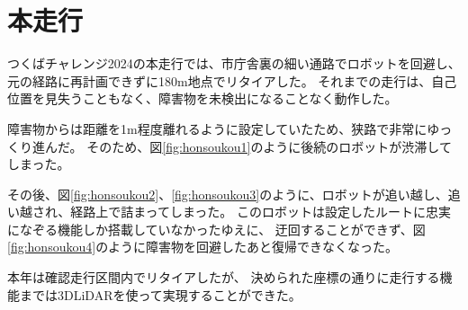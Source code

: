 \section{本走行}
つくばチャレンジ2024の本走行では、市庁舎裏の細い通路でロボットを回避し、元の経路に再計画できずに180m地点でリタイアした。
それまでの走行は、自己位置を見失うこともなく、障害物を未検出になることなく動作した。

障害物からは距離を1m程度離れるように設定していたため、狭路で非常にゆっくり進んだ。
そのため、図\ref{fig:honsoukou1}のように後続のロボットが渋滞してしまった。

その後、図\ref{fig:honsoukou2}、\ref{fig:honsoukou3}のように、ロボットが追い越し、追い越され、経路上で詰まってしまった。
このロボットは設定したルートに忠実になぞる機能しか搭載していなかったゆえに、
迂回することができず、図\ref{fig:honsoukou4}のように障害物を回避したあと復帰できなくなった。

本年は確認走行区間内でリタイアしたが、
決められた座標の通りに走行する機能までは3DLiDARを使って実現することができた。